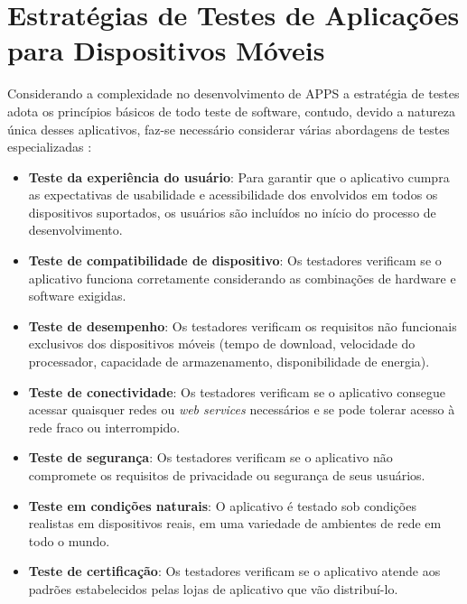  


\section{Estratégias de Testes de Aplicações para Dispositivos Móveis}\label{sec:testemobile}


Considerando a complexidade no desenvolvimento de \ac{APPS} a estratégia de testes adota os princípios básicos de todo teste de software, contudo, devido a natureza única desses aplicativos, faz-se necessário considerar várias abordagens de testes especializadas \cite{PRESSMAN2016}:


\begin{itemize}

    \item \textbf{Teste da experiência do usuário}: Para garantir que o aplicativo cumpra as expectativas de usabilidade e acessibilidade dos envolvidos em todos os dispositivos suportados, os usuários são incluídos no início do processo de desenvolvimento.
    
    \item \textbf{Teste de compatibilidade de dispositivo}: Os testadores verificam se o aplicativo funciona corretamente considerando as combinações de hardware e software exigidas.
    
    \item \textbf{Teste de desempenho}: Os testadores verificam os requisitos não funcionais exclusivos dos dispositivos móveis (tempo de download, velocidade do processador, capacidade de armazenamento, disponibilidade de energia).
    
    \item \textbf{Teste de conectividade}: Os testadores verificam se o aplicativo consegue acessar quaisquer redes ou \textit{web services} necessários e se pode tolerar acesso à rede fraco ou interrompido.
    
    \item \textbf{Teste de segurança}: Os testadores verificam se o aplicativo não compromete os requisitos de privacidade ou segurança de seus usuários.
    
    \item \textbf{Teste em condições naturais}: O aplicativo é testado sob condições realistas em dispositivos reais, em uma variedade de ambientes de rede em todo o mundo.
    
    \item \textbf{Teste de certificação}: Os testadores verificam se o aplicativo atende aos padrões estabelecidos pelas lojas de aplicativo que vão distribuí-lo.

\end{itemize}

